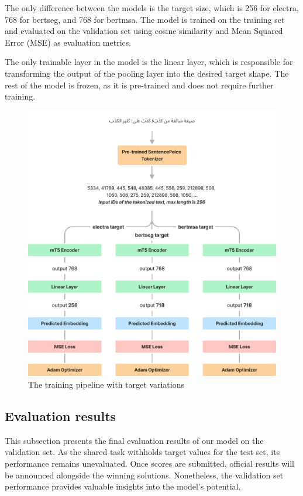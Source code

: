 \documentclass[12.5pt]{article}
\begin{document}
The only difference between the models is the target size, which is 256 for electra, 768 for bertseg, and 768 for bertmsa. The model is trained on the training set and evaluated on the validation set using cosine similarity and Mean Squared Error (MSE) as evaluation metrics.

The only trainable layer in the model is the linear layer, which is responsible for transforming the output of the pooling layer into the desired target shape. The rest of the model is frozen, as it is pre-trained and does not require further training.

\begin{figure}
    \centering
    \captionsetup{justification=centering}
    \includegraphics[width=\textwidth]{training.png}
    \caption{The training pipeline with target variations}
    \label{fig:training}
\end{figure}

\subsection{Evaluation results}

This subsection presents the final evaluation results of our model on the validation set. As the shared task withholds target values for the test set, its performance remains unevaluated. Once scores are submitted, official results will be announced alongside the winning solutions. Nonetheless, the validation set performance provides valuable insights into the model's potential.
\end{document}
